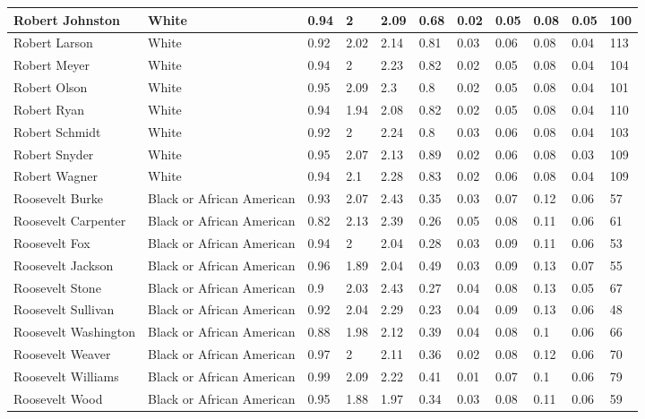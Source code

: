 \begin{table}[!ht]
\begin{tabular}{|l|l|l|l|l|l|l|l|l|l|l|}
        Robert Johnston & White & 0.94 & 2 & 2.09 & 0.68 & 0.02 & 0.05 & 0.08 & 0.05 & 100 \\ \hline
        Robert Larson & White & 0.92 & 2.02 & 2.14 & 0.81 & 0.03 & 0.06 & 0.08 & 0.04 & 113 \\ \hline
        Robert Meyer & White & 0.94 & 2 & 2.23 & 0.82 & 0.02 & 0.05 & 0.08 & 0.04 & 104 \\ \hline
        Robert Olson & White & 0.95 & 2.09 & 2.3 & 0.8 & 0.02 & 0.05 & 0.08 & 0.04 & 101 \\ \hline
        Robert Ryan & White & 0.94 & 1.94 & 2.08 & 0.82 & 0.02 & 0.05 & 0.08 & 0.04 & 110 \\ \hline
        Robert Schmidt & White & 0.92 & 2 & 2.24 & 0.8 & 0.03 & 0.06 & 0.08 & 0.04 & 103 \\ \hline
        Robert Snyder & White & 0.95 & 2.07 & 2.13 & 0.89 & 0.02 & 0.06 & 0.08 & 0.03 & 109 \\ \hline
        Robert Wagner & White & 0.94 & 2.1 & 2.28 & 0.83 & 0.02 & 0.06 & 0.08 & 0.04 & 109 \\ \hline
        Roosevelt Burke & Black or African American & 0.93 & 2.07 & 2.43 & 0.35 & 0.03 & 0.07 & 0.12 & 0.06 & 57 \\ \hline
        Roosevelt Carpenter & Black or African American & 0.82 & 2.13 & 2.39 & 0.26 & 0.05 & 0.08 & 0.11 & 0.06 & 61 \\ \hline
        Roosevelt Fox & Black or African American & 0.94 & 2 & 2.04 & 0.28 & 0.03 & 0.09 & 0.11 & 0.06 & 53 \\ \hline
        Roosevelt Jackson & Black or African American & 0.96 & 1.89 & 2.04 & 0.49 & 0.03 & 0.09 & 0.13 & 0.07 & 55 \\ \hline
        Roosevelt Stone & Black or African American & 0.9 & 2.03 & 2.43 & 0.27 & 0.04 & 0.08 & 0.13 & 0.05 & 67 \\ \hline
        Roosevelt Sullivan & Black or African American & 0.92 & 2.04 & 2.29 & 0.23 & 0.04 & 0.09 & 0.13 & 0.06 & 48 \\ \hline
        Roosevelt Washington & Black or African American & 0.88 & 1.98 & 2.12 & 0.39 & 0.04 & 0.08 & 0.1 & 0.06 & 66 \\ \hline
        Roosevelt Weaver & Black or African American & 0.97 & 2 & 2.11 & 0.36 & 0.02 & 0.08 & 0.12 & 0.06 & 70 \\ \hline
        Roosevelt Williams & Black or African American & 0.99 & 2.09 & 2.22 & 0.41 & 0.01 & 0.07 & 0.1 & 0.06 & 79 \\ \hline
        Roosevelt Wood & Black or African American & 0.95 & 1.88 & 1.97 & 0.34 & 0.03 & 0.08 & 0.11 & 0.06 & 59 \\ \hline

\end{tabular}
\end{table}
